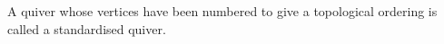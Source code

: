 A quiver whose vertices have been numbered to give a topological ordering is
called a standardised quiver.
